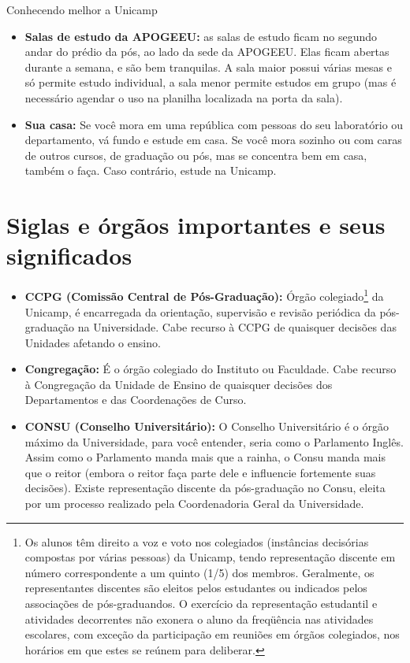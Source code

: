 \begin{story}{Conhecendo melhor a Unicamp}
\begin{itemize}
\item \textbf{Salas de estudo da APOGEEU:} as salas de estudo ficam no segundo andar do prédio da pós, ao lado da sede da APOGEEU. Elas ficam abertas durante a semana, e são bem tranquilas. A sala maior possui várias mesas e só permite estudo individual, a sala menor permite estudos em grupo (mas é necessário agendar o uso na planilha localizada na porta da sala).

\item \textbf{Sua casa:} Se você mora em uma república com pessoas do seu laboratório ou departamento, vá fundo e estude em casa. Se você mora sozinho ou com caras de outros cursos, de graduação ou pós, mas se concentra bem em casa, também o faça. Caso contrário, estude na Unicamp.

\end{itemize}

\section*{Siglas e órgãos importantes e seus significados}

\begin{itemize}
\item \textbf{CCPG (Comissão Central de Pós-Graduação):} Órgão colegiado\footnote{Os alunos têm direito a voz e voto nos colegiados (instâncias decisórias compostas por várias pessoas) da Unicamp, tendo representação discente em número correspondente a um quinto (1/5) dos membros. Geralmente, os representantes discentes são eleitos pelos estudantes ou indicados pelos associações de pós-graduandos. O exercício da representação estudantil e atividades decorrentes não exonera o aluno da freqüência nas atividades escolares, com exceção da participação em reuniões em órgãos colegiados, nos horários em que estes se reúnem para deliberar.} da Unicamp, é encarregada da orientação, supervisão e revisão periódica da pós-graduação na Universidade. Cabe recurso à CCPG de quaisquer decisões das Unidades afetando o ensino.

\item \textbf{Congregação:} É o órgão colegiado do Instituto ou Faculdade. Cabe recurso à Congregação da Unidade de Ensino de quaisquer decisões dos Departamentos e das Coordenações de Curso.

\item \textbf{CONSU (Conselho Universitário):} O Conselho Universitário é o órgão máximo da Universidade, para você entender, seria como o Parlamento Inglês. Assim como o Parlamento manda mais que a rainha, o Consu manda mais que o reitor (embora o reitor faça parte dele e influencie fortemente suas decisões). Existe representação discente da pós-graduação no Consu, eleita por um processo realizado pela Coordenadoria Geral da Universidade.


\end{itemize}
\end{story}
